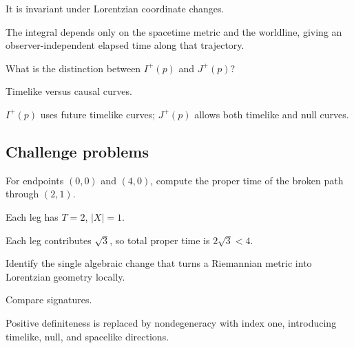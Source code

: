 \begin{hint}
It is invariant under Lorentzian coordinate changes.
\end{hint}

\begin{solution}
The integral depends only on the spacetime metric and the worldline, giving an observer-independent elapsed time along that trajectory.
\end{solution}

\begin{exercise}\label{exr:vii30-ped-14}
What is the distinction between \(I^+(p)\) and \(J^+(p)\)?
\end{exercise}

\begin{hint}
Timelike versus causal curves.
\end{hint}

\begin{solution}
\(I^+(p)\) uses future timelike curves; \(J^+(p)\) allows both timelike and null curves.
\end{solution}

\subsection*{Challenge problems}

\begin{exercise}\label{exr:vii30-ped-15}
For endpoints \((0,0)\) and \((4,0)\), compute the proper time of the broken path through \((2,1)\).
\end{exercise}

\begin{hint}
Each leg has \(T=2\), \(|X|=1\).
\end{hint}

\begin{solution}
Each leg contributes \(\sqrt3\), so total proper time is \(2\sqrt3<4\).
\end{solution}

\begin{exercise}\label{exr:vii30-ped-16}
Identify the single algebraic change that turns a Riemannian metric into Lorentzian geometry locally.
\end{exercise}

\begin{hint}
Compare signatures.
\end{hint}

\begin{solution}
Positive definiteness is replaced by nondegeneracy with index one, introducing timelike, null, and spacelike directions.
\end{solution}

